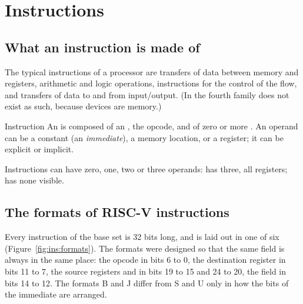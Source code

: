 \section{Instructions}

\subsection{What an instruction is made of}

The typical instructions of a processor are transfers of data between memory
and registers, arithmetic and logic operations, instructions for the control
of the flow, and transfers of data to and from input/output. (In \riscv the
fourth family does not exist as such, because devices are memory.)

\begin{definition}{Instruction}
An  is composed of an , the opcode,
and of zero or more . An operand can be a constant (an
\emph{immediate}), a memory location, or a register; it can be explicit or
implicit.
\end{definition}

Instructions can have zero, one, two or three operands:  has three,
all registers;  has none visible.

\subsection{The formats of RISC-V instructions}

Every \riscv instruction of the base set is 32 bits long, and is laid out in
one of six  (Figure~\ref{fig:ins:formats}). The formats were
designed so that the same field is always in the same place: the opcode in
bits 6 to 0, the destination register  in bits 11 to 7, the source
registers  and  in bits 19 to 15 and 24 to 20, the field
 in bits 14 to 12. The formats B and J differ from S and U only
in how the bits of the immediate are arranged.


